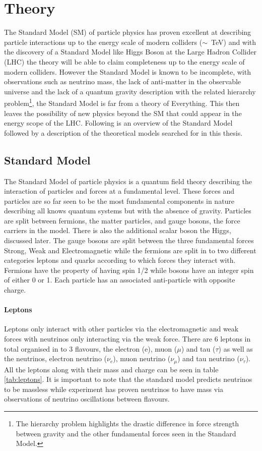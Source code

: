 \chapter{Theory}

    The Standard Model (SM) of particle physics has proven excellent at describing particle interactions up to the energy scale of modern colliders ($\sim$~TeV) and with the discovery of a Standard Model like Higgs Boson at the Large Hadron Collider (LHC) the theory will be able to claim completeness up to the energy scale of modern colliders. However the Standard Model is known to be incomplete, with observations such as neutrino mass, the lack of anti-matter in the observable universe and the lack of a quantum gravity description with the related hierarchy problem\footnote{The hierarchy problem highlights the drastic difference in force strength between gravity and the other fundamental forces seen in the Standard Model.}, the Standard Model is far from a theory of Everything. This then leaves the possibility of new physics beyond the SM that could appear in the energy scope of the LHC.
    Following is an overview of the Standard Model \cite{ulrik:GriffEP2008} followed by a description of the theoretical models searched for in this thesis. 

\section{Standard Model}
    
    The Standard Model of particle physics is a quantum field theory describing the interaction of particles and forces at a fundamental level. These forces and particles are so far seen to be the most fundamental components in nature describing all knows quantum systems but with the absence of gravity. Particles are split between fermions, the matter particles, and gauge bosons, the force carriers in the model. There is also the additional scalar boson the Higgs, discussed later. The gauge bosons are split between the three fundamental forces Strong, Weak and Electromagnetic while the fermions are split in to two different categories leptons and quarks according to which forces they interact with. Fermions have the property of having spin 1/2 while bosons have an integer spin of either 0 or 1. Each particle has an associated anti-particle with opposite charge. 

    \subsubsection*{Leptons}
    Leptons only interact with other particles via the electromagnetic and weak forces with neutrinos only interacting via the weak force. There are 6 leptons in total organised in to 3 flavours, the electron (e), muon ($\mu$) and tau ($\tau$) as well as the neutrinos, electron neutrino ($\nu_{e}$), muon neutrino ($\nu_{\mu}$) and tau neutrino ($\nu_{\tau}$). All the leptons along with their mass and charge can be seen in table \ref{tab:leptons}. It is important to note that the standard model predicts neutrinos to be massless while experiment has proven neutrinos to have mass via observations of neutrino oscillations between flavours. 


